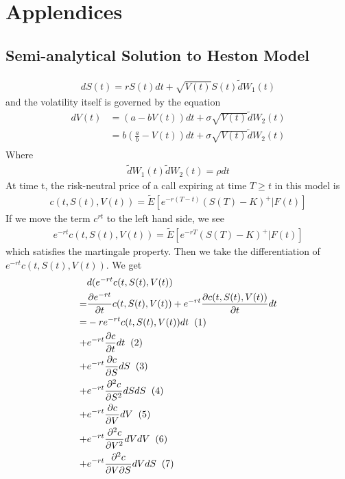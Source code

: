 \documentclass[a4paper]{article}
\begin{document}
\section{Applendices}
\subsection{Semi-analytical Solution to Heston Model}
\begin{align}
	dS(t) = rS(t)dt + \sqrt{V(t)} S(t) \tilde dW_1(t)
\end{align}
and the volatility itself is governed by the equation
\begin{align}
	dV(t) & = (a -bV(t))dt + \sigma \sqrt{V(t)} \tilde dW_2(t) \\
	      & = b(\frac{a}{b} -V(t))dt + \sigma \sqrt{V(t)} \tilde dW_2(t) \\
\end{align}
Where 
\begin{align*}
	\tilde dW_1(t) \tilde dW_2(t) = \rho dt
\end{align*}
At time t, the risk-neutral price of a call expiring at time $T \geq t$ in this model is
\begin{align*}
	c(t, S(t), V(t)) = \tilde E[e^{-r(T-t)}(S(T)-K)^+|F(t)]
\end{align*}
If we move the term $c^{rt}$ to the left hand side, we see
\begin{align}
	e^{-rt}c(t, S(t), V(t)) = \tilde E[e^{-rT}(S(T)-K)^+|F(t)]
\end{align}
which satisfies the martingale property.
Then we take the differentiation of $e^{-rt}c(t, S(t), V(t))$. We get
\begin{align*}
	& d(e^{-rt}c(t, S(t), V(t))\\
	= & \frac{\partial e^{-rt}}{\partial t} c(t, S(t), V(t)) 
	+ e^{-rt}\frac{\partial c(t, S(t), V(t))}{\partial t} dt \\
	= & -re^{-rt}c(t, S(t),V(t))dt \hspace{2mm} (1)\\
	+ & e^{-rt} \frac{\partial c}{\partial t} dt \hspace{2mm} (2) \\
	+ & e^{-rt} \frac{\partial c}{\partial S} dS \hspace{2mm} (3) \\
	+ & e^{-rt} \frac{\partial^2 c}{\partial S^2} dS dS \hspace{2mm} (4)\\
	+ & e^{-rt} \frac{\partial c}{\partial V} dV \hspace{2mm} (5) \\
	+ & e^{-rt} \frac{\partial^2 c}{\partial V^2} dV dV\hspace{2mm} (6)\\
	+ & e^{-rt} \frac{\partial^2 c}{\partial V \partial S} dV dS\hspace{2mm} (7)
\end{align*}
\end{document}
